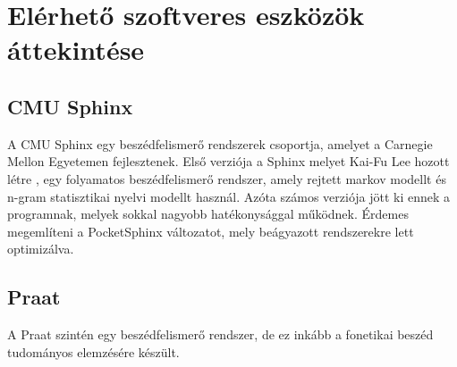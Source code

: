 \documentclass[a4paper,12pt]{paper}
\begin{document}
\section{Elérhető szoftveres eszközök áttekintése}


\subsection{CMU Sphinx}

A CMU Sphinx egy beszédfelismerő rendszerek csoportja, amelyet a Carnegie Mellon Egyetemen fejlesztenek. Első verziója a Sphinx melyet Kai-Fu Lee hozott létre , egy folyamatos beszédfelismerő rendszer, amely rejtett markov modellt és n-gram statisztikai nyelvi modellt használ. Azóta számos verziója jött ki ennek a programnak, melyek sokkal nagyobb hatékonysággal működnek. Érdemes megemlíteni a PocketSphinx változatot, mely beágyazott rendszerekre lett optimizálva. 

\subsection{Praat}

A Praat szintén egy beszédfelismerő rendszer, de ez inkább a fonetikai beszéd tudományos elemzésére készült.
\end{document}
